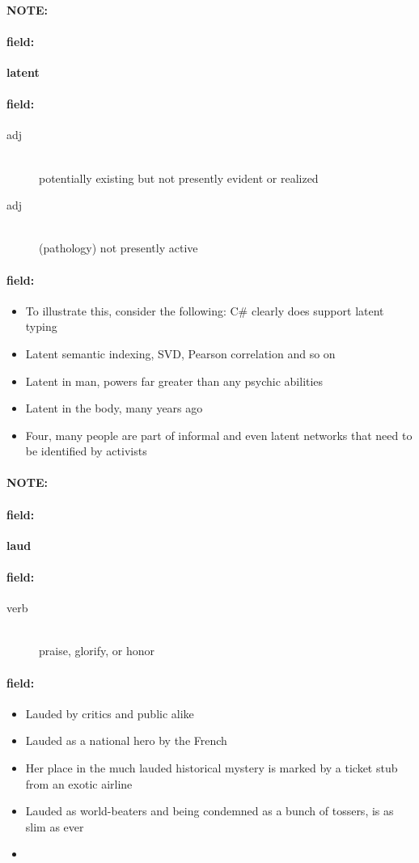 \documentclass[12pt]{article}
\newenvironment{note}{\paragraph{NOTE:}}{}
\newenvironment{field}{\paragraph{field:}}{}
\begin{document}
\begin{note}
\begin{field}
\textbf{\large latent}
\end{field}


\begin{field}
\begin{description}
\item[adj] \hfill \\ 
potentially existing but not presently evident or realized

\item[adj] \hfill \\ 
(pathology) not presently active

\end{description}
\end{field}

\begin{field}
\begin{itemize}
\item To illustrate this, consider the following: C# clearly does support latent typing
\item Latent semantic indexing, SVD, Pearson correlation and so on
\item Latent in man, powers far greater than any psychic abilities
\item Latent in the body, many years ago
\item Four, many people are part of informal and even latent networks that need to be identified by activists
\end{itemize}
\end{field}
\end{note}
\begin{note}
\begin{field}
\textbf{\large laud}
\end{field}


\begin{field}
\begin{description}
\item[verb] \hfill \\ 
praise, glorify, or honor

\end{description}
\end{field}

\begin{field}
\begin{itemize}
\item Lauded by critics and public alike
\item Lauded as a national hero by the French
\item Her place in the much lauded historical mystery is marked by a ticket stub from an exotic airline
\item Lauded as world-beaters and being condemned as a bunch of tossers, is as slim as ever
\item 
\end{itemize}
\end{field}
\end{note}
\end{document}
